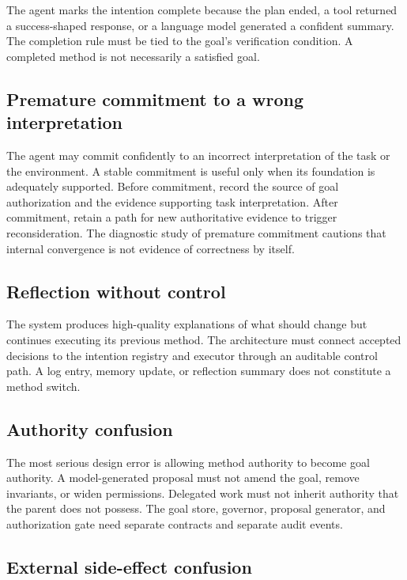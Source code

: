 The agent marks the intention complete because the plan ended, a tool returned a success-shaped response, or a language model generated a confident summary. The completion rule must be tied to the goal's verification condition. A completed method is not necessarily a satisfied goal.

\subsection{Premature commitment to a wrong interpretation}

The agent may commit confidently to an incorrect interpretation of the task or the environment. A stable commitment is useful only when its foundation is adequately supported. Before commitment, record the source of goal authorization and the evidence supporting task interpretation. After commitment, retain a path for new authoritative evidence to trigger reconsideration. The diagnostic study of premature commitment cautions that internal convergence is not evidence of correctness by itself.\autocite{mehta2026premature}

\subsection{Reflection without control}

The system produces high-quality explanations of what should change but continues executing its previous method. The architecture must connect accepted decisions to the intention registry and executor through an auditable control path. A log entry, memory update, or reflection summary does not constitute a method switch.

\subsection{Authority confusion}

The most serious design error is allowing method authority to become goal authority. A model-generated proposal must not amend the goal, remove invariants, or widen permissions. Delegated work must not inherit authority that the parent does not possess. The goal store, governor, proposal generator, and authorization gate need separate contracts and separate audit events.

\subsection{External side-effect confusion}


